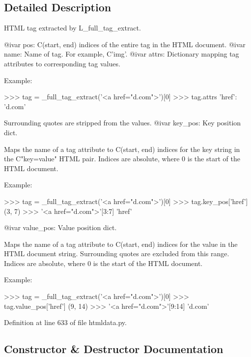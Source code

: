 \subsection{Detailed Description}
\begin{DoxyVerb}HTML tag extracted by L{_full_tag_extract}.

@ivar pos:       C{(start, end)} indices of the entire tag in the
                 HTML document.
@ivar name:      Name of tag.  For example, C{'img'}.
@ivar attrs:     Dictionary mapping tag attributes to corresponding
                 tag values.

                 Example:

                  >>> tag = _full_tag_extract('<a href="d.com">')[0]
                  >>> tag.attrs
                  {'href': 'd.com'}

                 Surrounding quotes are stripped from the values.
@ivar key_pos:   Key position dict.

                 Maps the name of a tag attribute to C{(start, end)}
                 indices for the key string in the C{"key=value"}
                 HTML pair.  Indices are absolute, where 0 is the
                 start of the HTML document.

                 Example:

                  >>> tag = _full_tag_extract('<a href="d.com">')[0]
                  >>> tag.key_pos['href']
                  (3, 7)
                  >>> '<a href="d.com">'[3:7]
                  'href'

@ivar value_pos: Value position dict.

                 Maps the name of a tag attribute to C{(start, end)}
                 indices for the value in the HTML document string.
                 Surrounding quotes are excluded from this range.
                 Indices are absolute, where 0 is the start of the
                 HTML document.

                 Example:

                  >>> tag = _full_tag_extract('<a href="d.com">')[0]
                  >>> tag.value_pos['href']
                  (9, 14)
                  >>> '<a href="d.com">'[9:14]
                  'd.com'
\end{DoxyVerb}
 

Definition at line 633 of file htmldata.\+py.



\subsection{Constructor \& Destructor Documentation}
